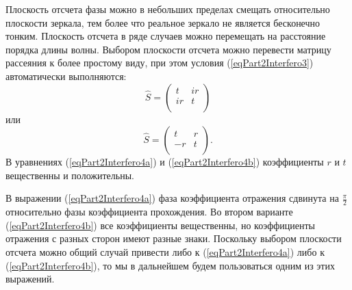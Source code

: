 Плоскость отсчета фазы можно в небольших пределах смещать относительно
плоскости зеркала, тем более что реальное зеркало не является
бесконечно тонким. Плоскость отсчета в ряде случаев можно перемещать
на расстояние порядка длины волны. Выбором плоскости отсчета можно
перевести матрицу рассеяния к более простому виду, при этом условия 
(\ref{eqPart2Interfero3}) автоматически выполняются: 
\begin{equation}
\hat{S} = \left(
\begin{array}{cc}
t & i r \\
i r & t \\
\end{array}
\right)
\label{eqPart2Interfero4a}
\end{equation}
или
\begin{equation}
\hat{S} = \left(
\begin{array}{cc}
t & r \\
-r & t \\
\end{array}
\right).
\label{eqPart2Interfero4b}
\end{equation}
В уравнениях (\ref{eqPart2Interfero4a}) и (\ref{eqPart2Interfero4b})
коэффициенты $r$ и $t$ вещественны и положительны.

В выражении (\ref{eqPart2Interfero4a}) фаза коэффициента отражения
сдвинута на $\frac{\pi}{2}$ относительно фазы коэффициента
прохождения. Во втором варианте (\ref{eqPart2Interfero4b}) все
коэффициенты вещественны, но коэффициенты отражения с разных сторон
имеют разные знаки. Поскольку выбором плоскости отсчета можно общий
случай привести либо к  (\ref{eqPart2Interfero4a}) либо к
(\ref{eqPart2Interfero4b}), то мы в дальнейшем будем пользоваться
одним из этих выражений.

